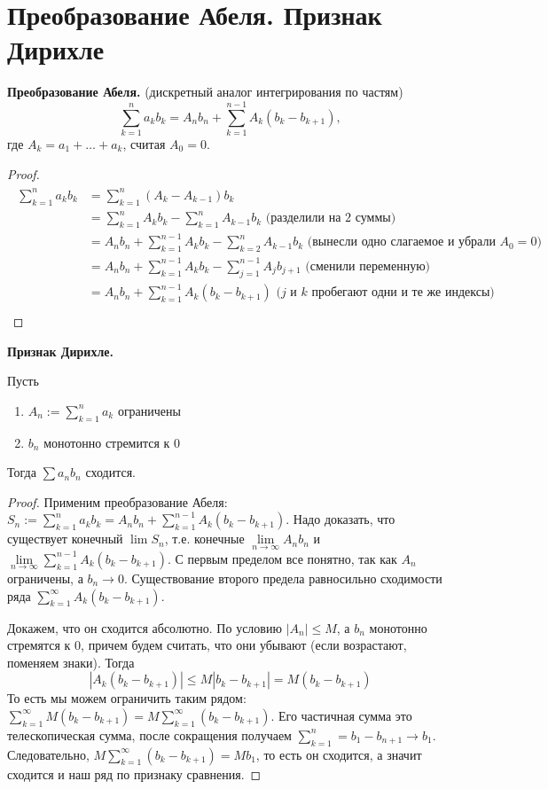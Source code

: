 \section{Преобразование Абеля. Признак Дирихле}
\textbf{Преобразование Абеля.} (дискретный аналог интегрирования по частям) \[ \sum_{k = 1}^n a_kb_k = A_nb_n + \sum_{k = 1}^{n - 1} A_k(b_k - b_{k+1}), \] где $A_k = a_1 + \dots + a_k$, считая $A_0 = 0$.
\begin{proof}
    \begin{gather*}
        \begin{split}
            \sum_{k = 1}^n a_kb_k &= \sum_{k = 1}^n (A_k - A_{k-1})b_k \\
            &= \sum_{k = 1}^n A_kb_k - \sum_{k = 1}^n A_{k-1}b_k \text{ (разделили на 2 суммы)} \\
            &= A_nb_n + \sum_{k = 1}^{n-1} A_kb_k - \sum_{k = 2}^n A_{k-1}b_k \text{ (вынесли одно слагаемое и убрали $A_0 = 0$)} \\
            &= A_nb_n + \sum_{k = 1}^{n-1} A_kb_k - \sum_{j = 1}^{n-1} A_jb_{j+1} \text{ (сменили переменную)} \\
            &= A_nb_n + \sum_{k = 1}^{n-1} A_k(b_k - b_{k+1}) \text{ ($j$ и $k$ пробегают одни и те же индексы)} \\
        \end{split}
    \end{gather*}
\end{proof} 

\textbf{Признак Дирихле.} 

 Пусть \begin{enumerate}
    \item $A_n := \sum\limits_{k = 1}^n a_k$ ограничены
    \item $b_n$ монотонно стремится к 0
\end{enumerate}
Тогда $\sum a_nb_n$ сходится.
\begin{proof}
    Применим преобразование Абеля: $S_n := \sum\limits_{k=1}^n a_kb_k = A_nb_n + \sum\limits_{k=1}^{n-1} A_k(b_k - b_{k+1})$.
    \quad Надо доказать, что существует конечный $\lim S_n$, т.е. конечные $\lim\limits_{n \to \infty} A_nb_n$ и $\lim\limits_{n \to \infty} \sum\limits_{k=1}^{n-1} A_k(b_k - b_{k+1})$.
    С первым пределом все понятно, так как $A_n$ ограничены, а $b_n \to 0$.
    Существование второго предела равносильно сходимости ряда $\sum\limits_{k=1}^{\infty} A_k(b_k - b_{k+1})$.

    \quad Докажем, что он сходится абсолютно. 
    По условию $|A_n| \leqslant M$, а $b_n$ монотонно стремятся к 0, причем будем считать, что они убывают (если возрастают, поменяем знаки).
    Тогда \[ |A_k(b_k - b_{k+1})| \leqslant M|b_k - b_{k+1}| = M(b_k - b_{k+1}) \]
    \quad То есть мы можем ограничить таким рядом: $ \sum\limits_{k=1}^{\infty} M(b_k - b_{k+1}) = M\sum\limits_{k=1}^{\infty} (b_k - b_{k+1}) $. 
    Его частичная сумма это телескопическая сумма, после сокращения получаем $\sum\limits_{k=1}^{n} = b_1 - b_{n+1} \to b_1$.
    Следовательно, $M\sum\limits_{k=1}^{\infty} (b_k - b_{k+1}) = Mb_1$, то есть он сходится, а значит сходится и наш ряд по признаку сравнения.
\end{proof}
